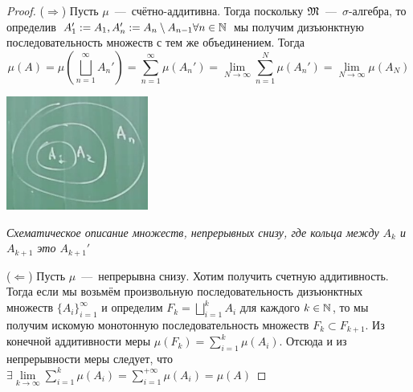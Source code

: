 \begin{proof}
($\Longrightarrow$) Пусть $\mu$~---~счётно-аддитивна. Тогда поскольку $\mathfrak{M}$~---~$\sigma$-алгебра, то определив $A_1' := A_1, A_n' := A_n \setminus A_{n - 1} \forall n \in \mathbb{N}$ мы получим дизъюнктную последовательность множеств с тем же объединением. Тогда \[\mu(A) = \mu(\bigsqcup\limits_{n = 1}^\infty A_n') = \sum\limits_{n = 1}^\infty \mu(A_n') = \lim\limits_{N \rightarrow \infty} \sum\limits_{n = 1}^N \mu(A_n') = \lim\limits_{N \rightarrow \infty} \mu(A_N)\]
    \begin{minipage}{\textwidth}
    \centering
    \includegraphics[width=0.35\textwidth]{images/Screenshot_5.png} 
    \end{minipage}
    \textit{Схематическое описание множеств, непрерывных снизу, где кольца между $A_k$ и $A_{k+1}$ это $A_{k+1}'$}


($\Longleftarrow$) Пусть $\mu$~---~непрерывна снизу. Хотим получить счетную аддитивность. Тогда если мы возьмём произвольную последовательность дизъюнктных множеств $\{A_i\}_{i = 1}^\infty$ и определим $F_k = \bigsqcup\limits_{i = 1}^k A_i$ для каждого $k \in \mathbb{N}$, то мы получим искомую монотонную последовательность множеств $F_k \subset F_{k+1}$.  Из конечной аддитивности меры $\mu(F_k) = \sum\limits_{i = 1}^k \mu (A_i)$. Отсюда и из непрерывности меры следует, что $\exists \lim\limits_{k \rightarrow \infty} \sum\limits_{i = 1}^k \mu (A_i) = \sum\limits_{i = 1}^{+\infty} \mu (A_i) = \mu(A)$
\end{proof}